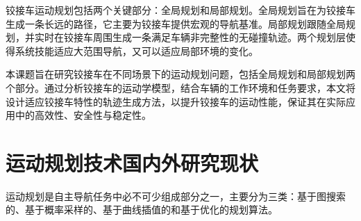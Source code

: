 \documentclass[master,academic]{ysuthesis} %
\begin{document}
	铰接车运动规划包括两个关键部分：全局规划和局部规划。全局规划旨在为铰接车生成一条长远的路径，它主要为铰接车提供宏观的导航基准\cite{li2022global}。局部规划跟随全局规划，并实时在铰接车周围生成一条满足车辆非完整性的无碰撞轨迹\cite{yang2023uav}。两个规划层使得系统技能适应大范围导航，又可以适应局部环境的变化。

	本课题旨在研究铰接车在不同场景下的运动规划问题，包括全局规划和局部规划两个部分。通过分析铰接车的运动学模型，结合车辆的工作环境和任务要求，本文将设计适应铰接车特性的轨迹生成方法，以提升铰接车的运动性能，保证其在实际应用中的高效性、安全性与稳定性。
	\section{运动规划技术国内外研究现状}
	运动规划是自主导航任务中必不可少组成部分之一，主要分为三类：基于图搜索的、基于概率采样的、基于曲线插值的和基于优化的规划算法。
\end{document}
